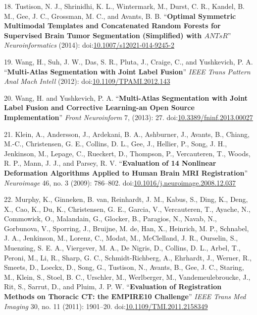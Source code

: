 \documentclass[11pt,]{article}
\begin{document}
18. Tustison, N. J., Shrinidhi, K. L., Wintermark, M., Durst, C. R.,
Kandel, B. M., Gee, J. C., Grossman, M. C., and Avants, B. B.
``\textbf{Optimal Symmetric Multimodal Templates and Concatenated Random
Forests for Supervised Brain Tumor Segmentation (Simplified) with
$ANTsR$}'' \emph{Neuroinformatics} (2014):
doi:\href{http://dx.doi.org/10.1007/s12021-014-9245-2}{10.1007/s12021-014-9245-2}

19. Wang, H., Suh, J. W., Das, S. R., Pluta, J., Craige, C., and
Yushkevich, P. A. ``\textbf{Multi-Atlas Segmentation with Joint Label
Fusion}'' \emph{IEEE Trans Pattern Anal Mach Intell} (2012):
doi:\href{http://dx.doi.org/10.1109/TPAMI.2012.143}{10.1109/TPAMI.2012.143}

20. Wang, H. and Yushkevich, P. A. ``\textbf{Multi-Atlas Segmentation
with Joint Label Fusion and Corrective Learning-an Open Source
Implementation}'' \emph{Front Neuroinform} 7, (2013): 27.
doi:\href{http://dx.doi.org/10.3389/fninf.2013.00027}{10.3389/fninf.2013.00027}

21. Klein, A., Andersson, J., Ardekani, B. A., Ashburner, J., Avants,
B., Chiang, M.-C., Christensen, G. E., Collins, D. L., Gee, J., Hellier,
P., Song, J. H., Jenkinson, M., Lepage, C., Rueckert, D., Thompson, P.,
Vercauteren, T., Woods, R. P., Mann, J. J., and Parsey, R. V.
``\textbf{Evaluation of 14 Nonlinear Deformation Algorithms Applied to
Human Brain MRI Registration}'' \emph{Neuroimage} 46, no. 3 (2009):
786--802.
doi:\href{http://dx.doi.org/10.1016/j.neuroimage.2008.12.037}{10.1016/j.neuroimage.2008.12.037}

22. Murphy, K., Ginneken, B. van, Reinhardt, J. M., Kabus, S., Ding, K.,
Deng, X., Cao, K., Du, K., Christensen, G. E., Garcia, V., Vercauteren,
T., Ayache, N., Commowick, O., Malandain, G., Glocker, B., Paragios, N.,
Navab, N., Gorbunova, V., Sporring, J., Bruijne, M. de, Han, X.,
Heinrich, M. P., Schnabel, J. A., Jenkinson, M., Lorenz, C., Modat, M.,
McClelland, J. R., Ourselin, S., Muenzing, S. E. A., Viergever, M. A.,
De Nigris, D., Collins, D. L., Arbel, T., Peroni, M., Li, R., Sharp, G.
C., Schmidt-Richberg, A., Ehrhardt, J., Werner, R., Smeets, D., Loeckx,
D., Song, G., Tustison, N., Avants, B., Gee, J. C., Staring, M., Klein,
S., Stoel, B. C., Urschler, M., Werlberger, M., Vandemeulebroucke, J.,
Rit, S., Sarrut, D., and Pluim, J. P. W. ``\textbf{Evaluation of
Registration Methods on Thoracic CT: the EMPIRE10 Challenge}''
\emph{IEEE Trans Med Imaging} 30, no. 11 (2011): 1901--20.
doi:\href{http://dx.doi.org/10.1109/TMI.2011.2158349}{10.1109/TMI.2011.2158349}
\end{document}
